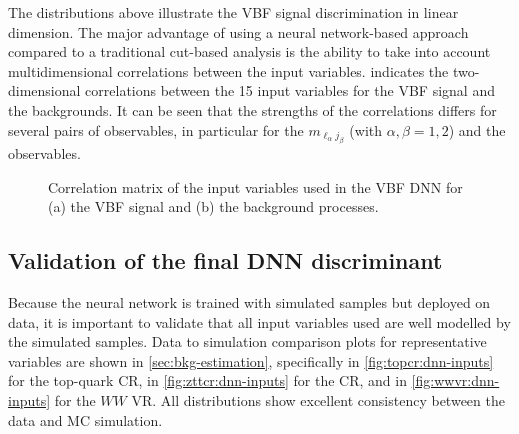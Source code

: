 The distributions above illustrate the VBF signal discrimination in linear dimension. The major advantage of using a neural network-based approach compared to a traditional cut-based analysis is the ability to take into account multidimensional correlations between the input variables.  indicates the two-dimensional correlations between the 15 input variables for the VBF signal and the backgrounds. It can be seen that the strengths of the correlations differs for several pairs of observables, in particular for the $m_{\ell_\alpha j_\beta}$ (with $\alpha, \beta = 1, 2$) and the \pTjthree observables.
\FloatBarrier
\begin{figure}[t]
    \caption[Correlation matrix of the input variables used in the VBF DNN.]{Correlation matrix of the input variables used in the VBF DNN for (a) the VBF signal and (b) the background processes.}
    \label{fig:dnn-features-correlations}
\end{figure}

\subsection{Validation of the final DNN discriminant}
\label{subsec:fina-model-validation}
Because the neural network is trained with simulated samples but deployed on data, it is important to validate that all input variables used are well modelled by the simulated samples.
Data to simulation comparison plots for representative variables are shown in \cref{sec:bkg-estimation}, specifically in \cref{fig:topcr:dnn-inputs} for the top-quark CR, in \cref{fig:zttcr:dnn-inputs} for the \Ztautau CR, and in \cref{fig:wwvr:dnn-inputs} for the $WW$ VR. All distributions show excellent consistency between the data and MC simulation.

